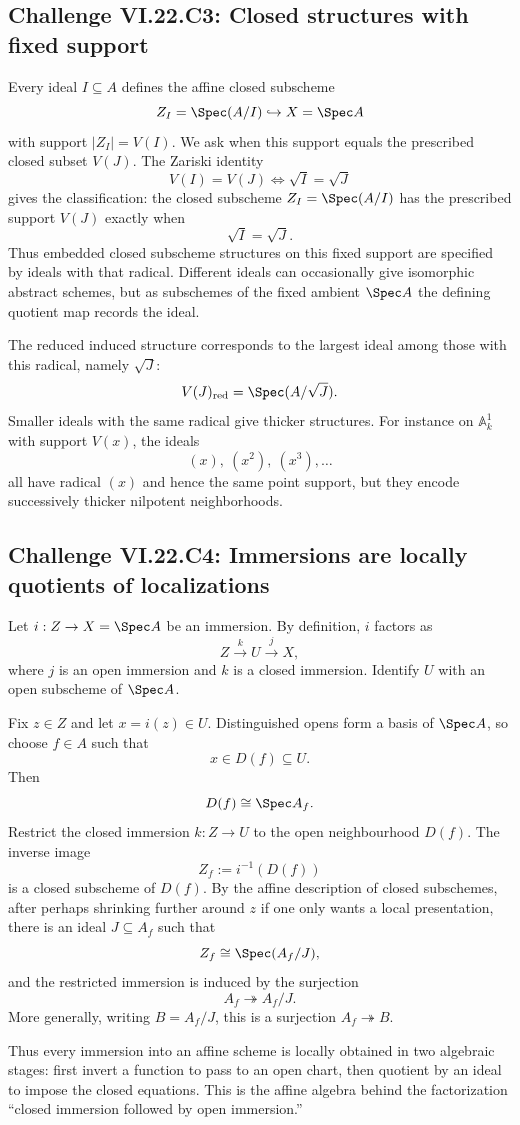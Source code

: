 \subsection*{Challenge VI.22.C3: Closed structures with fixed support}
\begin{solution}
Every ideal $I\subseteq A$ defines the affine closed subscheme
\[
 Z_I=\Spec(A/I)\hookrightarrow X=\Spec A
\]
with support $|Z_I|=V(I)$.  We ask when this support equals the prescribed closed subset
$V(J)$.  The Zariski identity
\[
 V(I)=V(J)
 \iff \sqrt I=\sqrt J
\]
gives the classification: the closed subscheme $Z_I=\Spec(A/I)$ has the prescribed support
$V(J)$ exactly when
\[
 \sqrt I=\sqrt J.
\]
Thus embedded closed subscheme structures on this fixed support are specified by ideals with
that radical.  Different ideals can occasionally give isomorphic abstract schemes, but as
subschemes of the fixed ambient $\Spec A$ the defining quotient map records the ideal.

The reduced induced structure corresponds to the largest ideal among those with this radical,
namely $\sqrt J$:
\[
 V(J)_{\mathrm{red}}=\Spec(A/\sqrt J).
\]
Smaller ideals with the same radical give thicker structures.  For instance on
$\mathbb A^1_k$ with support $V(x)$, the ideals
\[
 (x),\ (x^2),\ (x^3),\ldots
\]
all have radical $(x)$ and hence the same point support, but they encode successively thicker
nilpotent neighborhoods.
\end{solution}

\subsection*{Challenge VI.22.C4: Immersions are locally quotients of localizations}
\begin{solution}
Let $i:Z\to X=\Spec A$ be an immersion.  By definition, $i$ factors as
\[
 Z\xrightarrow{k}U\xrightarrow{j}X,
\]
where $j$ is an open immersion and $k$ is a closed immersion.  Identify $U$ with an open
subscheme of $\Spec A$.

Fix $z\in Z$ and let $x=i(z)\in U$.  Distinguished opens form a basis of $\Spec A$, so choose
$f\in A$ such that
\[
 x\in D(f)\subseteq U.
\]
Then
\[
 D(f)\cong\Spec A_f.
\]
Restrict the closed immersion $k:Z\to U$ to the open neighbourhood $D(f)$.  The inverse image
\[
 Z_f:=i^{-1}(D(f))
\]
is a closed subscheme of $D(f)$.  By the affine description of closed subschemes, after perhaps
shrinking further around $z$ if one only wants a local presentation, there is an ideal
$J\subseteq A_f$ such that
\[
 Z_f\cong\Spec(A_f/J),
\]
and the restricted immersion is induced by the surjection
\[
 \boxed{A_f\twoheadrightarrow A_f/J.}
\]
More generally, writing $B=A_f/J$, this is a surjection $A_f\twoheadrightarrow B$.

Thus every immersion into an affine scheme is locally obtained in two algebraic stages:
first invert a function to pass to an open chart, then quotient by an ideal to impose the
closed equations.  This is the affine algebra behind the factorization
``closed immersion followed by open immersion.''
\end{solution}

